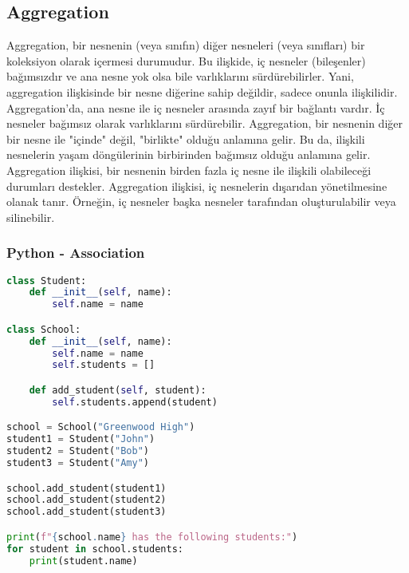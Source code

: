 \newpage

\subsection{Aggregation}

Aggregation, bir nesnenin (veya sınıfın) diğer nesneleri (veya sınıfları) bir koleksiyon olarak içermesi durumudur. Bu ilişkide, iç nesneler (bileşenler) bağımsızdır ve ana nesne yok olsa bile varlıklarını sürdürebilirler. Yani, aggregation ilişkisinde bir nesne diğerine sahip değildir, sadece onunla ilişkilidir. Aggregation'da, ana nesne ile iç nesneler arasında zayıf bir bağlantı vardır. İç nesneler bağımsız olarak varlıklarını sürdürebilir. Aggregation, bir nesnenin diğer bir nesne ile "içinde" değil, "birlikte" olduğu anlamına gelir. Bu da, ilişkili nesnelerin yaşam döngülerinin birbirinden bağımsız olduğu anlamına gelir. Aggregation ilişkisi, bir nesnenin birden fazla iç nesne ile ilişkili olabileceği durumları destekler. Aggregation ilişkisi, iç nesnelerin dışarıdan yönetilmesine olanak tanır. Örneğin, iç nesneler başka nesneler tarafından oluşturulabilir veya silinebilir.

\subsubsection{Python - Association}

\begin{lstlisting}[language=Python]
class Student:
    def __init__(self, name):
        self.name = name

class School:
    def __init__(self, name):
        self.name = name
        self.students = []

    def add_student(self, student):
        self.students.append(student)

school = School("Greenwood High")
student1 = Student("John")
student2 = Student("Bob")
student3 = Student("Amy")

school.add_student(student1)
school.add_student(student2)
school.add_student(student3)

print(f"{school.name} has the following students:")
for student in school.students:
    print(student.name)
\end{lstlisting}

\newpage